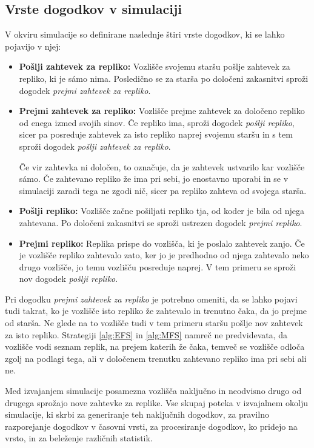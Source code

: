 \documentclass[a4paper, 12pt]{book}
\begin{document}
\subsection{Vrste dogodkov v simulaciji}
V okviru simulacije so definirane naslednje štiri vrste dogodkov, ki se lahko
pojavijo v njej:
\begin{itemize}
  \item \textbf{Pošlji zahtevek za repliko:} Vozlišče svojemu staršu pošlje
  zahtevek za repliko, ki je sámo nima. Posledično se za starša po določeni
  zakasnitvi sproži dogodek \textit{prejmi zahtevek za repliko}.

  \item \textbf{Prejmi zahtevek za repliko:} Vozlišče prejme zahtevek za
  določeno repliko od enega izmed svojih sinov. Če repliko ima, sproži dogodek
  \textit{pošlji repliko}, sicer pa posreduje zahtevek za isto repliko
  naprej svojemu staršu in s tem sproži dogodek \textit{pošlji zahtevek za
  repliko}.

  Če vir zahtevka ni določen, to označuje, da je zahtevek ustvarilo kar
  vozlišče sámo. Če zahtevano repliko že ima pri sebi, jo enostavno
  uporabi in se v simulaciji zaradi tega ne zgodi nič, sicer pa repliko
  zahteva od svojega starša.

  \item \textbf{Pošlji repliko:} Vozlišče začne pošiljati repliko tja, od
  koder je bila od njega zahtevana. Po določeni zakasnitvi se sproži ustrezen
  dogodek \textit{prejmi repliko}.

  \item \textbf{Prejmi repliko:} Replika prispe do vozlišča, ki je poslalo
  zahtevek zanjo. Če je vozlišče repliko zahtevalo zato, ker jo je predhodno
  od njega zahtevalo neko drugo vozlišče, jo temu vozlišču posreduje naprej.
  V tem primeru se sproži nov dogodek \textit{pošlji repliko}.
\end{itemize}

Pri dogodku \textit{prejmi zahtevek za repliko} je potrebno omeniti, da se
lahko pojavi tudi takrat, ko je vozlišče isto repliko že zahtevalo in trenutno
čaka, da jo prejme od starša. Ne glede na to vozlišče tudi v tem primeru staršu
pošlje nov zahtevek za isto repliko. Strategiji \ref{alg:EFS} in \ref{alg:MFS}
namreč ne predvidevata, da vozlišče vodi seznam replik, na prejem katerih
že čaka, temveč se vozlišče odloča zgolj na podlagi tega, ali v določenem
trenutku zahtevano repliko ima pri sebi ali ne.

Med izvajanjem simulacije posamezna vozlišča naključno in neodvisno drugo od
drugega sprožajo nove zahtevke za replike. Vse skupaj poteka v izvajalnem
okolju simulacije, ki skrbi za generiranje teh naključnih dogodkov, za
pravilno razporejanje dogodkov v časovni vrsti, za procesiranje dogodkov,
ko pridejo na vrsto, in za beleženje različnih statistik.
\end{document}
